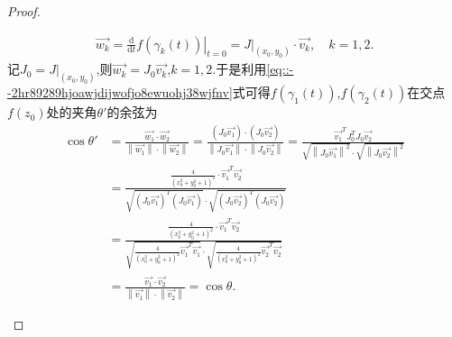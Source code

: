 \documentclass[../../main.tex]{subfiles}%
\begin{document}
\begin{proof}
\begin{enumerate}[(1)]
\begin{align*}
\overrightarrow{w_k}=\left. \frac{\mathrm{d}}{\mathrm{d}t}f\left( \gamma _k\left( t \right) \right) \right| _{t=0}=\left. J \right| _{\left( x_0,y_0 \right)}\cdot \overrightarrow{v_k},\quad k=1,2.
\end{align*}
记$J_0=\left. J \right| _{\left( x_0,y_0 \right)}$,则$\overrightarrow{w_k}=J_0\overrightarrow{v_k}$,$k=1,2$.于是利用\eqref{eq::--2hr89289hjoawjdijwofjo8ewuohj38wjfnv}式可得$f\left( \gamma _1\left( t \right) \right)$,$f\left( \gamma _2\left( t \right) \right)$在交点$f\left( z_0 \right)$处的夹角$\theta'$的余弦为
\begin{align*}
\cos \theta' &=\frac{\overrightarrow{w_1}\cdot \overrightarrow{w_2}}{\left\| \overrightarrow{w_1} \right\| \cdot \left\| \overrightarrow{w_2} \right\|}=\frac{\left( J_0\overrightarrow{v_1} \right) \cdot \left( J_0\overrightarrow{v_2} \right)}{\left\| J_0\overrightarrow{v_1} \right\| \cdot \left\| J_0\overrightarrow{v_2} \right\|}=\frac{\overrightarrow{v_1}^TJ_{0}^{T}J_0\overrightarrow{v_2}}{\sqrt{\left\| J_0\overrightarrow{v_1} \right\| ^2}\cdot \sqrt{\left\| J_0\overrightarrow{v_2} \right\| ^2}} \\
&=\frac{\frac{4}{\left( x_{0}^{2}+y_{0}^{2}+1 \right) ^2}\cdot \overrightarrow{v_1}^T\overrightarrow{v_2}}{\sqrt{\left( J_0\overrightarrow{v_1} \right) ^T\left( J_0\overrightarrow{v_1} \right)}\cdot \sqrt{\left( J_0\overrightarrow{v_2} \right) ^T\left( J_0\overrightarrow{v_2} \right)}} \\
&=\frac{\frac{4}{\left( x_{0}^{2}+y_{0}^{2}+1 \right) ^2}\cdot \overrightarrow{v_1}^T\overrightarrow{v_2}}{\sqrt{\frac{4}{\left( x_{0}^{2}+y_{0}^{2}+1 \right) ^2}\overrightarrow{v_1}^T\overrightarrow{v_1}}\cdot \sqrt{\frac{4}{\left( x_{0}^{2}+y_{0}^{2}+1 \right) ^2}\overrightarrow{v_2}^T\overrightarrow{v_2}}} \\
&=\frac{\overrightarrow{v_1}\cdot \overrightarrow{v_2}}{\left\| \overrightarrow{v_1} \right\| \cdot \left\| \overrightarrow{v_2} \right\|}=\cos \theta.
\end{align*}

\end{enumerate}
\end{proof}
\end{document}
